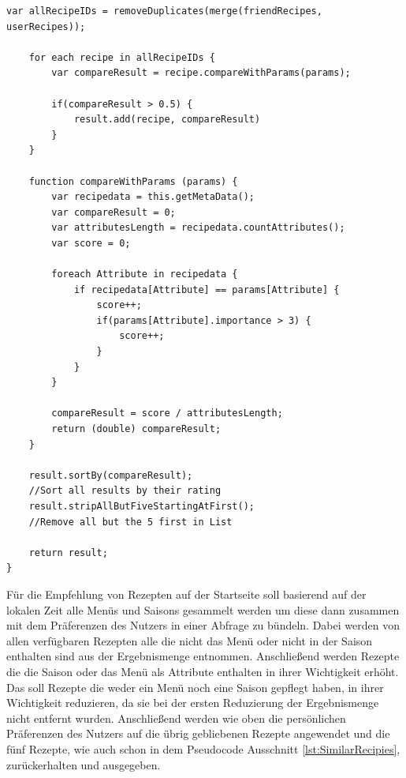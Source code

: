 \begin{lstlisting}[caption=Pseudocode - Ähnliche Rezepte,label={lst:SimilarRecipies}]
    var allRecipeIDs = removeDuplicates(merge(friendRecipes, userRecipes));

    for each recipe in allRecipeIDs {
        var compareResult = recipe.compareWithParams(params);

        if(compareResult > 0.5) {
            result.add(recipe, compareResult)
        }
    }

    function compareWithParams (params) {
        var recipedata = this.getMetaData();
        var compareResult = 0;
        var attributesLength = recipedata.countAttributes();
        var score = 0;

        foreach Attribute in recipedata {
            if recipedata[Attribute] == params[Attribute] {
                score++;
                if(params[Attribute].importance > 3) {
                    score++;
                }
            }
        }

        compareResult = score / attributesLength;
        return (double) compareResult;
    }

    result.sortBy(compareResult);               
    //Sort all results by their rating
    result.stripAllButFiveStartingAtFirst();    
    //Remove all but the 5 first in List

    return result;
}
\end{lstlisting}
Für die Empfehlung von Rezepten auf der Startseite soll basierend auf der lokalen Zeit alle Menüs und Saisons gesammelt werden um diese dann zusammen mit dem Präferenzen des Nutzers in einer Abfrage zu bündeln. Dabei werden von allen verfügbaren Rezepten alle die nicht das Menü oder nicht in der Saison enthalten sind aus der Ergebnismenge entnommen. Anschließend werden Rezepte die die Saison oder das Menü als Attribute enthalten in ihrer Wichtigkeit erhöht. Das soll Rezepte die weder ein Menü noch eine Saison gepflegt haben, in ihrer Wichtigkeit reduzieren, da sie bei der ersten Reduzierung der Ergebnismenge nicht entfernt wurden. Anschließend werden wie oben die persönlichen Präferenzen des Nutzers auf die übrig gebliebenen Rezepte angewendet und die fünf Rezepte, wie auch schon in dem Pseudocode Ausschnitt \ref{lst:SimilarRecipies}, zurückerhalten und ausgegeben. \\
